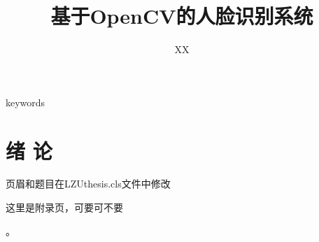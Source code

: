 \documentclass[AutoFakeBold]{LZUThesis}
\begin{document}
%
%


\title{{基于OpenCV的人脸识别系统}}




\author{XX}



\maketitle
\frontmatter





{keywords
}

\tableofcontents
\thispagestyle{empty}


\mainmatter

\chapter{绪 \qquad 论}
页眉和题目在LZUthesis.cls文件中修改




\backmatter


\printbib



\Appendix


这里是附录页，可要可不要

\Thanks。
\end{document}
